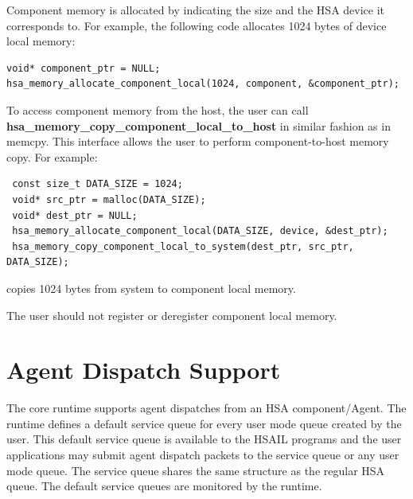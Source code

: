 \documentclass[final]{book}
\newcommand{\reffun}[1]{\textbf{#1}}
\begin{document}
Component memory is allocated by indicating the size and the HSA device it
corresponds to. For example, the following code allocates 1024 bytes of device
local memory:

\begin{lstlisting}
void* component_ptr = NULL;
hsa_memory_allocate_component_local(1024, component, &component_ptr);
\end{lstlisting}

To access component memory from the host, the user can call
\reffun{hsa_memory_copy_component_local_to_host} in similar fashion as in
memcpy. This interface allows the user to perform component-to-host memory
copy. For example:

\begin{lstlisting}
 const size_t DATA_SIZE = 1024;
 void* src_ptr = malloc(DATA_SIZE);
 void* dest_ptr = NULL;
 hsa_memory_allocate_component_local(DATA_SIZE, device, &dest_ptr);
 hsa_memory_copy_component_local_to_system(dest_ptr, src_ptr, DATA_SIZE);
\end{lstlisting}

copies 1024 bytes from system to component local memory.

The user should not register or deregister component local memory.









\hypertarget{agent}{}\section{Agent Dispatch Support}\label{agent}

The core runtime supports agent dispatches from an HSA component/Agent. The
runtime defines a default service queue for every user mode queue created by the
user. This default service queue is available to the HSAIL programs and the user
applications may submit agent dispatch packets to the service queue or any user
mode queue. The service queue shares the same structure as the regular HSA
queue. The default service queues are monitored by the
runtime. \makeatletter{}
\end{document}
